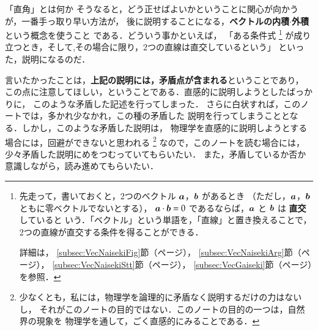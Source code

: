 \begin{memo}{「直角」とは何か}
                そうなると，どう正せばよいかということに関心が向かうが，一番手っ取り早い方法が，
                後に説明することになる，\textbf{ベクトルの内積$\cdot$外積} という概念を使うこと
                である．どういう事かといえば，
                「ある条件式
                        \footnote{
                            先走って，書いておくと，2つのベクトル $\boldsymbol{a}$，$\boldsymbol{b}$ があるとき
                            （ただし，$\boldsymbol{a}$，$\boldsymbol{b}$ ともに零ベクトルでないとする），
                            $\boldsymbol{a}\cdot\boldsymbol{b}=0$ であるならば，$\boldsymbol{a}$ と $\boldsymbol{b}$ は \textbf{直交} していると
                            いう．「ベクトル」という単語を，「直線」と置き換えることで，
                            2つの直線が直交する条件を得ることができる．

                            詳細は，
                            \ref{subsec:VecNaisekiFig}節（\pageref{subsec:VecNaisekiFig}ページ），
                            \ref{subsec:VecNaisekiArg}節（\pageref{subsec:VecNaisekiArg}ページ），
                            \ref{subsec:VecNaisekiStt}節（\pageref{subsec:VecNaisekiStt}ページ），
                            \ref{subsec:VecGaiseki}節（\pageref{subsec:VecGaiseki}ページ）を参照．
                        }
                が成り立つとき，そして,その場合に限り，2つの直線は直交しているという」
                といった，説明になるのだ．

                言いたかったことは，\textbf{上記の説明には，矛盾点が含まれる}ということであり，
                この点に注意してほしい，ということである．直感的に説明しようとしたばっかりに，
                このような矛盾した記述を行ってしまった．
                さらに白状すれば，このノートでは，多かれ少なかれ，この種の矛盾した
                説明を行ってしまうこととなる．しかし，このような矛盾した説明は，
                物理学を直感的に説明しようとする場合には，回避ができないと思われる
                    \footnote{
                        少なくとも，私には，物理学を論理的に矛盾なく説明するだけの力はないし，
                        それがこのノートの目的ではない．このノートの目的の一つは，自然界の現象を
                        物理学を通して，ごく直感的にみることである．
                    }
                なので，このノートを読む場合には，少々矛盾した説明にめをつむっていてもらいたい．
                また，矛盾しているか否か意識しながら，読み進めてもらいたい．
            \end{memo}

